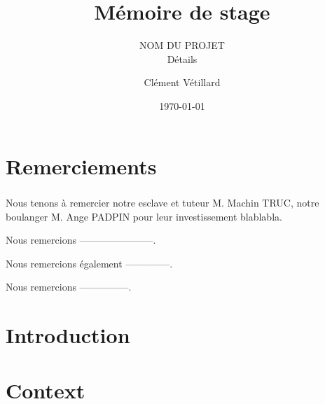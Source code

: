 \documentclass[a4paper, 12pt]{scrreprt}
\title{
	\Huge \bfseries Mémoire de stage
}
\subtitle{
	NOM DU PROJET
	\hfill\\
	{\normalfont Détails}
}
\author{
	\small
	Clément Vétillard
}
\date{\today}
\begin{document}
	\maketitle

	\tableofcontents
	
	\chapter*{Remerciements}
		\paragraph{}
			Nous tenons à remercier notre esclave et tuteur M. Machin TRUC, notre boulanger M. Ange PADPIN pour leur investissement blablabla.
			
			
			Nous remercions -----------------------.
			
			Nous remercions également --------------.
			
			Nous remercions ---------------. 
		
	\clearpage
	
	\chapter*{Introduction}
	\chapter{Context}
\end{document}
